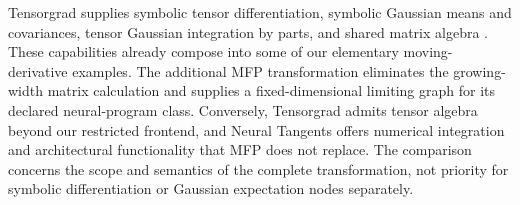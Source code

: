 Tensorgrad supplies symbolic tensor differentiation, symbolic Gaussian
means and covariances, tensor Gaussian integration by parts, and shared
matrix algebra \cite{ahle2026tensorgrad}. These capabilities already
compose into some of our elementary moving-derivative examples. The
additional MFP transformation eliminates the growing-width matrix
calculation and supplies a fixed-dimensional limiting graph for its
declared neural-program class. Conversely, Tensorgrad admits tensor
algebra beyond our restricted frontend, and Neural Tangents offers
numerical integration and architectural functionality that MFP does not
replace. The comparison concerns the scope and semantics of the complete
transformation, not priority for symbolic differentiation or Gaussian
expectation nodes separately.
